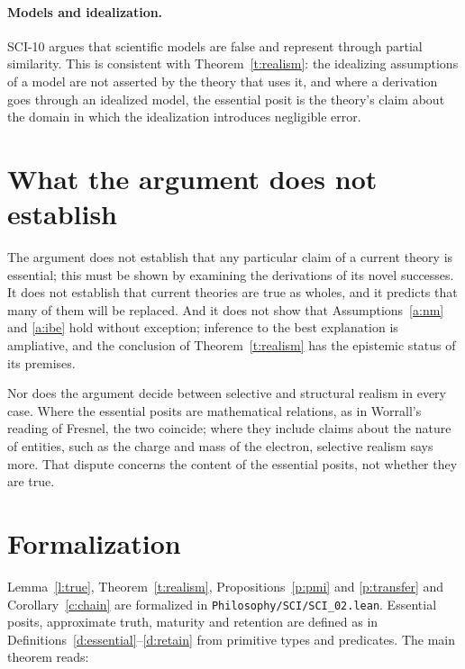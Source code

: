 \documentclass{situationist-preprint}
\begin{document}
\paragraph{Models and idealization.} SCI-10 argues that scientific models are false and represent through partial similarity. This is consistent with Theorem~\ref{t:realism}: the idealizing assumptions of a model are not asserted by the theory that uses it, and where a derivation goes through an idealized model, the essential posit is the theory's claim about the domain in which the idealization introduces negligible error.

\section{What the argument does not establish}

\begin{remark}\label{r:limits}
The argument does not establish that any particular claim of a current theory is essential; this must be shown by examining the derivations of its novel successes. It does not establish that current theories are true as wholes, and it predicts that many of them will be replaced. And it does not show that Assumptions~\ref{a:nm} and \ref{a:ibe} hold without exception; inference to the best explanation is ampliative, and the conclusion of Theorem~\ref{t:realism} has the epistemic status of its premises.
\end{remark}

Nor does the argument decide between selective and structural realism in every case. Where the essential posits are mathematical relations, as in Worrall's reading of Fresnel, the two coincide; where they include claims about the nature of entities, such as the charge and mass of the electron, selective realism says more. That dispute concerns the content of the essential posits, not whether they are true.

\section{Formalization}

Lemma~\ref{l:true}, Theorem~\ref{t:realism}, Propositions~\ref{p:pmi} and \ref{p:transfer} and Corollary~\ref{c:chain} are formalized in \nolinkurl{Philosophy/SCI/SCI_02.lean}. Essential posits, approximate truth, maturity and retention are defined as in Definitions~\ref{d:essential}--\ref{d:retain} from primitive types and predicates. The main theorem reads:
\end{document}
